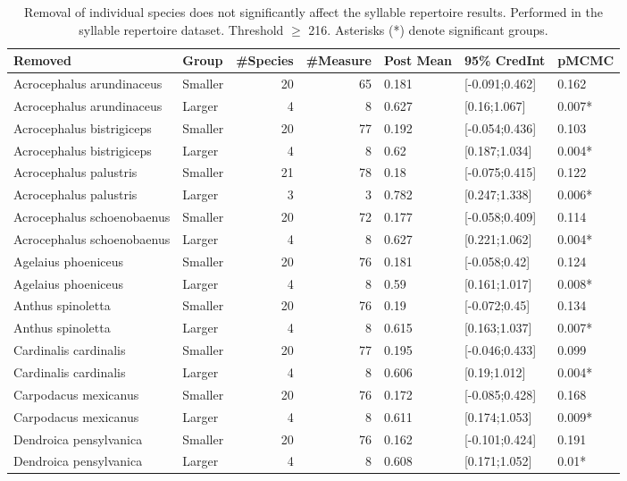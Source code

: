 \documentclass{article}
\begin{document}
  \begin{table}[H]
  \centering
  \caption{Removal of individual species does not significantly affect the syllable repertoire
  results. Performed in the syllable repertoire dataset. Threshold $\ge$ 216. Asterisks (*) denote significant groups.}
  \begin{tabular}{llrrlll}
  \hline
  Removed & Group & \#Species & \#Measure & Post Mean & 95\% CredInt & pMCMC \\ 
  \hline
  Acrocephalus arundinaceus & Smaller & 20 & 65 & 0.181 & [-0.091;0.462] & 0.162 \\ 
  Acrocephalus arundinaceus & Larger & 4 & 8 & 0.627 & [0.16;1.067] & 0.007* \\ 
  Acrocephalus bistrigiceps & Smaller & 20 & 77 & 0.192 & [-0.054;0.436] & 0.103 \\ 
  Acrocephalus bistrigiceps & Larger & 4 & 8 & 0.62 & [0.187;1.034] & 0.004* \\ 
  Acrocephalus palustris & Smaller & 21 & 78 & 0.18 & [-0.075;0.415] & 0.122 \\ 
  Acrocephalus palustris & Larger & 3 & 3 & 0.782 & [0.247;1.338] & 0.006* \\ 
  Acrocephalus schoenobaenus & Smaller & 20 & 72 & 0.177 & [-0.058;0.409] & 0.114 \\ 
  Acrocephalus schoenobaenus & Larger & 4 & 8 & 0.627 & [0.221;1.062] & 0.004* \\ 
  Agelaius phoeniceus & Smaller & 20 & 76 & 0.181 & [-0.058;0.42] & 0.124 \\ 
  Agelaius phoeniceus & Larger & 4 & 8 & 0.59 & [0.161;1.017] & 0.008* \\ 
  Anthus spinoletta & Smaller & 20 & 76 & 0.19 & [-0.072;0.45] & 0.134 \\ 
  Anthus spinoletta & Larger & 4 & 8 & 0.615 & [0.163;1.037] & 0.007* \\ 
  Cardinalis cardinalis & Smaller & 20 & 77 & 0.195 & [-0.046;0.433] & 0.099 \\ 
  Cardinalis cardinalis & Larger & 4 & 8 & 0.606 & [0.19;1.012] & 0.004* \\ 
  Carpodacus mexicanus & Smaller & 20 & 76 & 0.172 & [-0.085;0.428] & 0.168 \\ 
  Carpodacus mexicanus & Larger & 4 & 8 & 0.611 & [0.174;1.053] & 0.009* \\ 
  Dendroica pensylvanica & Smaller & 20 & 76 & 0.162 & [-0.101;0.424] & 0.191 \\ 
  Dendroica pensylvanica & Larger & 4 & 8 & 0.608 & [0.171;1.052] & 0.01* \\ 

\end{tabular}
\end{table}
\end{document}
